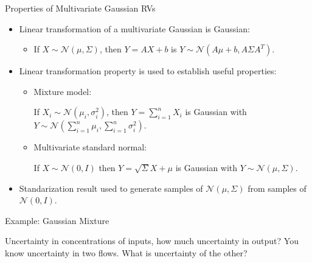 \documentclass[9pt]{beamer}
\begin{document}
%
\begin{frame}{Properties of Multivariate Gaussian RVs}

\begin{itemize}
\item Linear transformation of a multivariate Gaussian is Gaussian: 
\begin{itemize}
\item If $X\sim\mathcal{N}(\mu,\Sigma)$, then $Y=AX+b$ is $Y\sim \mathcal{N}(A\mu+b,A\Sigma A^T)$. 
\end{itemize}
\vspace{0.1in}
\item Linear transformation property is used to establish useful properties:
\begin{itemize}
\item Mixture model:

 If $X_i\sim \mathcal{N}(\mu_i,\sigma_i^2)$, then $Y=\sum_{i=1}^nX_i$ is Gaussian with $Y\sim\mathcal{N}(\sum_{i=1}^n\mu_i,\sum_{i=1}^n\sigma_i^2)$. 
 \vspace{0.1in}
\item Multivariate standard normal: 

If $X\sim\mathcal{N}(0,{I})$ then $Y=\sqrt{\Sigma}X+\mu$ is Gaussian with $Y\sim\mathcal{N}(\mu,\Sigma)$.
\end{itemize}
\item Standarization result used to generate samples of $\mathcal{N}(\mu,\Sigma)$ from samples of $\mathcal{N}(0,I)$.
\end{itemize}

\end{frame}

%
\begin{frame}{Example: Gaussian Mixture}

\begin{block}{}
Uncertainty in concentrations of inputs, how much uncertainty in output? You know uncertainty in two flows. What is uncertainty of the other? 
\end{block}

\end{frame}
\end{document}
